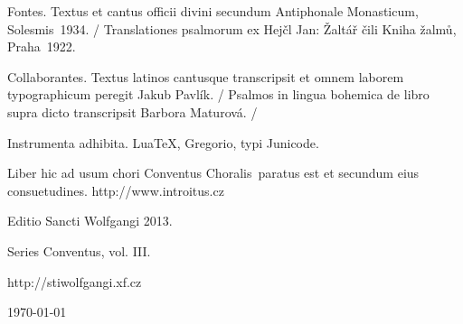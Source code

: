 \documentclass[a4paper, twoside, 12pt]{article}
\newcommand{\annusEditionis}{2013}
\begin{document}
Fontes. 
Textus et cantus officii divini secundum 
Antiphonale Monasticum, Solesmis~1934. /
Translationes psalmorum ex
Hejčl Jan: Žaltář čili Kniha žalmů, Praha~1922.

Collaborantes.
Textus latinos cantusque transcripsit et omnem laborem typographicum peregit
Jakub Pavlík. /
Psalmos in lingua bohemica de libro supra dicto transcripsit
Barbora Maturová. /

Instrumenta adhibita.
LuaTeX, %
Gregorio, %
typi Junicode. %

\begin{center}
Liber hic ad usum chori 
\guillemotright Conventus Choralis\guillemotleft\ 
paratus est
et secundum eius consuetudines.
http://www.introitus.cz

\vspace{1cm}

{\large Editio Sancti Wolfgangi \annusEditionis .}

\vspace{2mm}

Series \guillemotright Conventus\guillemotleft, vol. III.

\vspace{1cm}

http://stiwolfgangi.xf.cz
\vfill

\today

\end{center}
\end{document}
